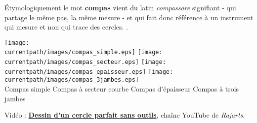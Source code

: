 \vspace*{-5mm}


\vfill

\begin{debat}
    Étymologiquement le mot {\bf compas} vient du latin {\it compassare} signifiant - qui partage le même pas, la même mesure - et qui fait donc référence à un instrument qui mesure et non qui trace des cercles.
    . \\
    \begin{center}
        \small
        \texttt{[image: \\currentpath/images/compas\_simple.eps]}
        \qquad
        \texttt{[image: \\currentpath/images/compas\_secteur.eps]}
        \qquad
        \texttt{[image: \\currentpath/images/compas\_epaisseur.eps]}
        \qquad
        \texttt{[image: \\currentpath/images/compas\_3jambes.eps]} \\
        Compas simple \quad Compas à secteur courbe \; Compas d'épaisseur \quad Compas à trois jambes
    \end{center}
    \vfill
    \begin{cadre}[B2][F4]
        \begin{center}
            Vidéo : \href{https://www.youtube.com/watch?v=gXOW4e708Hs&vl=fr}{\bf Dessin d'un cercle parfait sans outils}, chaîne YouTube de {\it Rajarts}.      \end{center}
    \end{cadre}
\end{debat}
